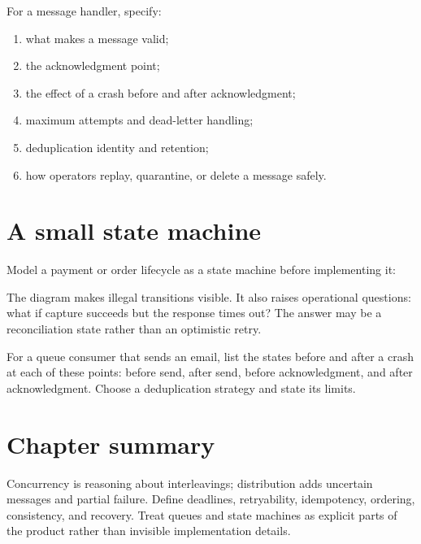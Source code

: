 For a message handler, specify:

\begin{enumerate}
  \item what makes a message valid;
  \item the acknowledgment point;
  \item the effect of a crash before and after acknowledgment;
  \item maximum attempts and dead-letter handling;
  \item deduplication identity and retention;
  \item how operators replay, quarantine, or delete a message safely.
\end{enumerate}

\section{A small state machine}
Model a payment or order lifecycle as a state machine before implementing it:

\begin{center}
\end{center}

The diagram makes illegal transitions visible. It also raises operational
questions: what if capture succeeds but the response times out? The answer may
be a reconciliation state rather than an optimistic retry.

\begin{exercise}
For a queue consumer that sends an email, list the states before and after a
crash at each of these points: before send, after send, before acknowledgment,
and after acknowledgment. Choose a deduplication strategy and state its limits.
\end{exercise}

\section{Chapter summary}
Concurrency is reasoning about interleavings; distribution adds uncertain
messages and partial failure. Define deadlines, retryability, idempotency,
ordering, consistency, and recovery. Treat queues and state machines as explicit
parts of the product rather than invisible implementation details.

